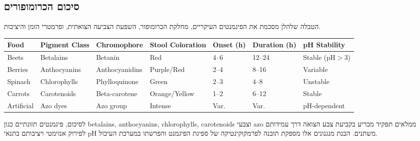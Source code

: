 \subsection{\texthebrew{סיכום הכרומופורים}}

\begin{hebrew}הטבלה שלהלן מסכמת את הפיגמנטים העיקריים, מחלקת הכרומופור, השפעת הצביעה הצואתית, ופרמטרי הזמן והיציבות.\end{hebrew}

\begin{table}[h]\centering\small
\setlength{\tabcolsep}{3pt}
\begin{tabular}{lllllll}
\toprule
\textenglish{Food} & \textenglish{Pigment Class} & \textenglish{Chromophore} & \textenglish{Stool Coloration} & \textenglish{Onset (h)} & \textenglish{Duration (h)} & \textenglish{pH Stability} \\
\midrule
\textenglish{Beets} & \textenglish{Betalains} & \textenglish{Betanin} & \textenglish{Red} & \textenglish{4--6} & \textenglish{12--24} & \textenglish{Stable (pH$>$3)} \\
\textenglish{Berries} & \textenglish{Anthocyanins} & \textenglish{Anthocyanidins} & \textenglish{Purple/Red} & \textenglish{2--4} & \textenglish{8--16} & \textenglish{Variable} \\
\textenglish{Spinach} & \textenglish{Chlorophylls} & \textenglish{Phylloquinone} & \textenglish{Green} & \textenglish{2--3} & \textenglish{4--8} & \textenglish{Unstable} \\
\textenglish{Carrots} & \textenglish{Carotenoids} & \textenglish{Beta-carotene} & \textenglish{Orange/Yellow} & \textenglish{1--2} & \textenglish{6--12} & \textenglish{Stable} \\
\textenglish{Artificial} & \textenglish{Azo dyes} & \textenglish{Azo group} & \textenglish{Intense} & \textenglish{Var.} & \textenglish{Var.} & \textenglish{pH-dependent} \\
\bottomrule
\end{tabular}
\end{table}

\begin{hebrew}לסיכום, פיגמנטים תזונתיים כגון \textenglish{betalains}, \textenglish{anthocyanins}, \textenglish{chlorophylls}, \textenglish{carotenoids} וצבעי \textenglish{azo} ממלאים תפקיד מכריע בקביעת צבע הצואה דרך עמידותם לפירוק אנזימטי ויציבותם בתנאי \textenglish{pH} משתנים. הבנת מנגנונים אלו מספקת תובנה לפרמקוקינטיקה של ספיגת הפיגמנט והפרשתו במערכת העיכול.\end{hebrew}

